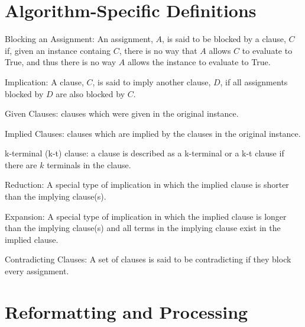 \documentclass[manuscript]{acmart}
\begin{document}
    \section{Algorithm-Specific Definitions}
    \begin{definition}
        Blocking an Assignment: An assignment, $A$, is said to be blocked by a clause, $C$ if, 
        given an instance containg $C$, there is no way that $A$ allows $C$ to evaluate to True, and
        thus there is no way $A$ allows the instance to evaluate to True.
    \end{definition}
    \begin{definition}
        Implication: A clause, $C$, is said to imply another clause, $D$, if all 
        assignments blocked by $D$ are also blocked by $C$.
    \end{definition}
    \begin{definition}
        Given Clauses: clauses which were given in the original instance.
    \end{definition}
    \begin{definition}
        Implied Clauses: clauses which are implied by the clauses in the original instance.
    \end{definition}
    \begin{definition}
        k-terminal (k-t) clause: a clause is described as a k-terminal or a k-t clause
        if there are $k$ terminals in the clause.
    \end{definition}
    \begin{definition}
        Reduction: A special type of implication in which the implied 
        clause is shorter than the implying clause(s).
    \end{definition}
    \begin{definition}
        Expansion: A special type of implication in which the 
        implied clause is longer than the implying clause(s) and all terms in the implying
        clause exist in the implied clause.
    \end{definition}
    \begin{definition}
        Contradicting Clauses: A set of clauses is said to be contradicting if
        they block every assignment.
    \end{definition}

    \section{Reformatting and Processing}
\end{document}
